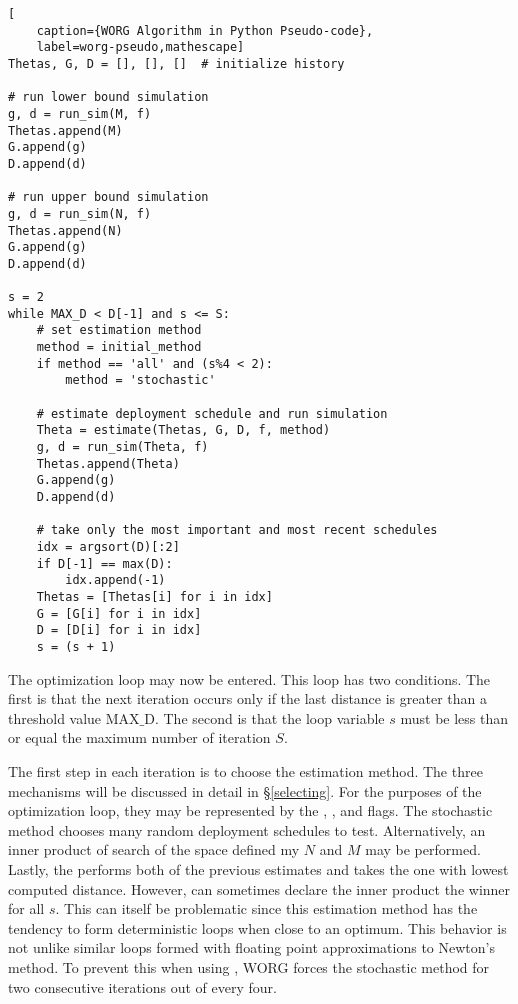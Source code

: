 \clearpage
\begin{lstlisting}[
    caption={WORG Algorithm in Python Pseudo-code},
    label=worg-pseudo,mathescape]
Thetas, G, D = [], [], []  # initialize history

# run lower bound simulation
g, d = run_sim(M, f)
Thetas.append(M)
G.append(g)
D.append(d)

# run upper bound simulation    
g, d = run_sim(N, f)
Thetas.append(N)
G.append(g)
D.append(d)

s = 2
while MAX_D < D[-1] and s <= S:
    # set estimation method
    method = initial_method
    if method == 'all' and (s%4 < 2):
        method = 'stochastic'

    # estimate deployment schedule and run simulation
    Theta = estimate(Thetas, G, D, f, method)
    g, d = run_sim(Theta, f)
    Thetas.append(Theta)
    G.append(g)
    D.append(d)

    # take only the most important and most recent schedules
    idx = argsort(D)[:2]
    if D[-1] == max(D):
        idx.append(-1)
    Thetas = [Thetas[i] for i in idx]
    G = [G[i] for i in idx]
    D = [D[i] for i in idx]
    s = (s + 1)
\end{lstlisting}
\clearpage

The optimization loop may now be entered.  This loop has two conditions.
The first is that the next iteration occurs only if the last distance
is greater than a threshold value $\mathrm{MAX\_D}$. The second is that 
the loop variable $s$ must be less than or equal the maximum number
of iteration $S$.

The first step in each iteration is to choose the estimation method. The
three mechanisms will be discussed in detail in \S\ref{selecting}. For
the purposes of the optimization loop, they may be represented by the 
\stochastic, \innerprod, and \allflag flags. The stochastic method 
chooses many random deployment schedules to test. Alternatively, an inner
product of search of the space defined my $N$ and $M$ may be performed. 
Lastly, the \allflag performs both of the previous estimates and takes
the one with lowest computed distance.  However, \allflag can sometimes
declare the inner product the winner for all $s$.  This can itself 
be problematic since this estimation method has the tendency to form 
deterministic loops when close to an optimum. This behavior is not unlike
similar loops formed with floating point approximations to Newton's method.
To prevent this when using \allflag, WORG forces the stochastic method
for two consecutive iterations out of every four.  
 

